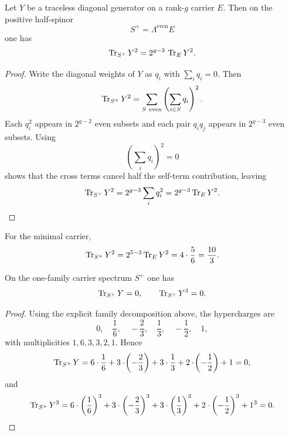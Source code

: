 \begin{theorem}
Let $Y$ be a traceless diagonal generator on a rank-$g$ carrier $E$. Then on the positive half-spinor
\[
S^+ = \Lambda^{\mathrm{even}}E
\]
one has
\[
\operatorname{Tr}_{S^+}Y^2 = 2^{g-3}\,\operatorname{Tr}_EY^2.
\]
\end{theorem}

\begin{proof}
Write the diagonal weights of $Y$ as $q_i$ with $\sum_i q_i=0$. Then
\[
\operatorname{Tr}_{S^+}Y^2
=
\sum_{S\ \mathrm{even}}
\left(\sum_{i\in S} q_i\right)^2.
\]
Each $q_i^2$ appears in $2^{g-2}$ even subsets and each pair $q_iq_j$ appears in $2^{g-3}$ even subsets. Using
\[
\left(\sum_i q_i\right)^2=0
\]
shows that the cross terms cancel half the self-term contribution, leaving
\[
\operatorname{Tr}_{S^+}Y^2
=
2^{g-3}\sum_i q_i^2
=
2^{g-3}\operatorname{Tr}_EY^2.
\]
\end{proof}

\begin{corollary}
For the minimal carrier,
\[
\operatorname{Tr}_{S^+}Y^2 = 2^{5-3}\operatorname{Tr}_EY^2 = 4\cdot\frac56 = \frac{10}{3}.
\]
\end{corollary}

\begin{theorem}
On the one-family carrier spectrum $S^+$ one has
\[
\operatorname{Tr}_{S^+}Y = 0,
\qquad
\operatorname{Tr}_{S^+}Y^3 = 0.
\]
\end{theorem}

\begin{proof}
Using the explicit family decomposition above, the hypercharges are
\[
0,\quad \frac16,\quad -\frac23,\quad \frac13,\quad -\frac12,\quad 1,
\]
with multiplicities $1,6,3,3,2,1$. Hence
\[
\operatorname{Tr}_{S^+}Y
= 6\cdot\frac16+3\cdot\!\left(-\frac23\right)+3\cdot\frac13+2\cdot\!\left(-\frac12\right)+1=0,
\]
and
\[
\operatorname{Tr}_{S^+}Y^3
= 6\cdot\left(\frac16\right)^3
+3\cdot\left(-\frac23\right)^3
+3\cdot\left(\frac13\right)^3
+2\cdot\left(-\frac12\right)^3
+1^3=0.
\]
\end{proof}

